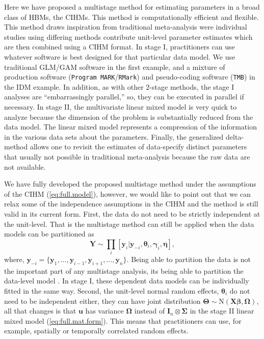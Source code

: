 \documentclass[12pt]{article}
\newcommand{\by}{\mathbf{y}}
\newcommand{\bt}{\boldsymbol{\theta}}
\newcommand{\bb}{\boldsymbol{\beta}}
\newcommand{\bn}{\boldsymbol{\eta}}
\newcommand{\bT}{\boldsymbol{\Theta}}
\newcommand{\bg}{\boldsymbol{\gamma}}
\newcommand{\bSig}{\boldsymbol{\Sigma}}
\newcommand{\bO}{\boldsymbol{\Omega}}
\newcommand{\bX}{\mathbf{X}}
\newcommand{\bu}{\mathbf{u}}
\newcommand{\tN}{\text{N}}
\newcommand{\bY}{\mathbf{Y}}
\newcommand{\bI}{\mathbf{I}}
\begin{document}
Here we have proposed a multistage method for estimating parameters in a broad class of HBMs, the CIHMs. This method is computationally efficient and flexible. This method draws inspiration from traditional meta-analysis were individual studies using differing methods contribute unit-level parameter estimates which are then combined using a CIHM format. In stage I, practitioners can use whatever software is best designed for that particular data model. We use traditional GLM/GAM software in the first example, and a mixture of production software ({\tt Program MARK}/{\tt RMark}) and pseudo-coding software ({\tt TMB}) in the IDM example. In addition, as with other 2-stage methods, the stage I analyses are ``embarrassingly parallel,'' so, they can be executed in parallel if necessary. In stage II, the multivariate linear mixed model is very quick to analyze because the dimension of the problem is substantially reduced from the data model. The linear mixed model represents a compression of the information in the various data sets about the parameters. Finally, the generalized delta-method allows one to revisit the estimates of data-specify distinct parameters that usually not possible in traditional meta-analysis because the raw data are not available.  

We have fully developed the proposed multistage method under the assumptions of the CIHM (\ref{eq:full.model}), however, we would like to point out that we can relax some of the independence assumptions in the CIHM and the method is still valid in its current form. First, the data do not need to be strictly independent at the unit-level. That is the multistage method can still be applied when the data models can be partitioned as
\[
\bY \sim \prod_i[\by_i|\by_{-i}, \bt_i, \bg_i, \bn],
\]
where, $\by_{-i} = \{\by_1,\dots,\by_{i-1},\by_{i+1},\dots,\by_n\}$. Being able to partition the data is not the important part of any multistage analysis, its being able to partition the data-level model \citep{hooten2018prior}. In stage I, these dependent data models can be individually fitted in the same way. Second, the unit-level normal random effects, $\bt_i$ do not need to be independent either, they can have joint distribution $\bT  \sim \tN(\bX\bb, \bO)$, all that changes is that $\bu$ has variance $\bO$ instead of $\bI_n \otimes \bSig$ in the stage II linear mixed model (\ref{eq:full.mat.form}). This means that practitioners can use, for example, spatially or temporally correlated random effects. 
\end{document}

